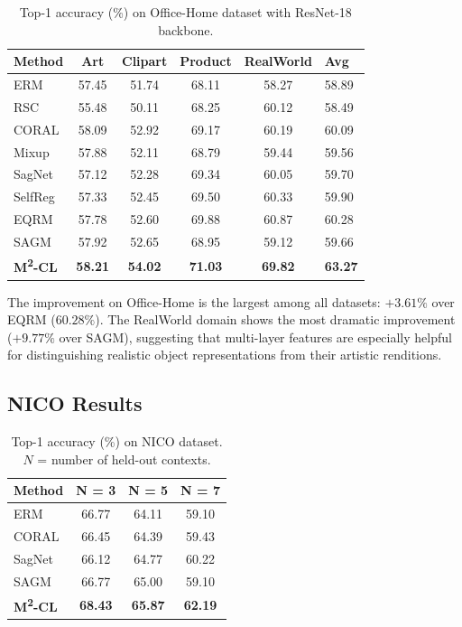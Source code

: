 \documentclass[12pt,a4paper]{article}
\newcommand{\tablehl}{\rowcolor{LightBlue!50}}
\begin{document}
\begin{table}[H]
  \centering
  \caption{Top-1 accuracy (\%) on Office-Home dataset with ResNet-18 backbone.}
  \label{tab:oh}
  \begin{tabular}{@{}lccccC{1.3cm}@{}}
    \toprule
    \textbf{Method} & \textbf{Art} & \textbf{Clipart} & \textbf{Product}
      & \textbf{RealWorld} & \textbf{Avg} \\
    \midrule
    ERM       & 57.45 & 51.74 & 68.11 & 58.27 & 58.89 \\
    RSC       & 55.48 & 50.11 & 68.25 & 60.12 & 58.49 \\
    CORAL     & 58.09 & 52.92 & 69.17 & 60.19 & 60.09 \\
    Mixup     & 57.88 & 52.11 & 68.79 & 59.44 & 59.56 \\
    SagNet    & 57.12 & 52.28 & 69.34 & 60.05 & 59.70 \\
    SelfReg   & 57.33 & 52.45 & 69.50 & 60.33 & 59.90 \\
    EQRM      & 57.78 & 52.60 & 69.88 & 60.87 & 60.28 \\
    SAGM      & 57.92 & 52.65 & 68.95 & 59.12 & 59.66 \\
    \midrule
    \tablehl
    \textbf{M\textsuperscript{2}-CL} & \textbf{58.21} & \textbf{54.02} & \textbf{71.03}
      & \textbf{69.82} & \textbf{63.27} \\
    \bottomrule
  \end{tabular}
\end{table}

The improvement on Office-Home is the largest among all datasets: $+3.61\%$ over EQRM
($60.28\%$). The RealWorld domain shows the most dramatic improvement ($+9.77\%$ over SAGM),
suggesting that multi-layer features are especially helpful for distinguishing realistic
object representations from their artistic renditions.

\subsection{NICO Results}

\begin{table}[H]
  \centering
  \caption{Top-1 accuracy (\%) on NICO dataset. $N$ = number of held-out contexts.}
  \label{tab:nico}
  \begin{tabular}{@{}lccc@{}}
    \toprule
    \textbf{Method} & \textbf{N = 3} & \textbf{N = 5} & \textbf{N = 7} \\
    \midrule
    ERM     & 66.77 & 64.11 & 59.10 \\
    CORAL   & 66.45 & 64.39 & 59.43 \\
    SagNet  & 66.12 & 64.77 & 60.22 \\
    SAGM    & 66.77 & 65.00 & 59.10 \\
    \midrule
    \tablehl
    \textbf{M\textsuperscript{2}-CL} & \textbf{68.43} & \textbf{65.87} & \textbf{62.19} \\
    \bottomrule
  \end{tabular}
\end{table}
\end{document}
